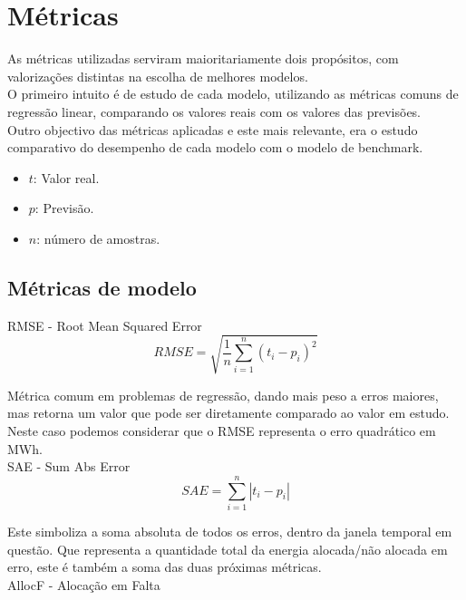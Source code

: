 \chapter{Métricas}

As métricas utilizadas serviram maioritariamente dois propósitos, com valorizações distintas na escolha de melhores modelos. \\
O primeiro intuito é de estudo de cada modelo, utilizando as métricas comuns de regressão linear, comparando os valores reais com os valores das previsões.\\
Outro objectivo das métricas aplicadas e este mais relevante, era o estudo comparativo do desempenho de cada modelo com o modelo de benchmark.\\


\begin{itemize}
    \item $t$: Valor real.
    \item $p$: Previsão.
    \item $n$: número de amostras.
  \end{itemize}


\section{Métricas de modelo}

\bigskip
RMSE - Root Mean Squared Error \\

\begin{equation} \label{eq:rmse} 
    RMSE = \sqrt{\frac{1}{n} \sum_{i=1}^{n}(t_i - p_i)^2} 
\end{equation}
\smallskip

Métrica comum em problemas de regressão, dando mais peso a erros maiores, mas retorna um valor que pode ser diretamente comparado ao valor em estudo. Neste caso podemos considerar que o RMSE representa o erro quadrático em MWh. \\
\bigskip
SAE - Sum Abs Error \\


\begin{equation} \label{eq:sae} 
    SAE = \sum_{i=1}^{n}\left|t_i - p_i \right|
\end{equation}
\smallskip

Este simboliza a soma absoluta de todos os erros, dentro da janela temporal em questão. Que representa a quantidade total da energia alocada/não alocada em erro, este é também a soma das duas próximas métricas.\\
\bigskip
AllocF - Alocação em Falta \\

